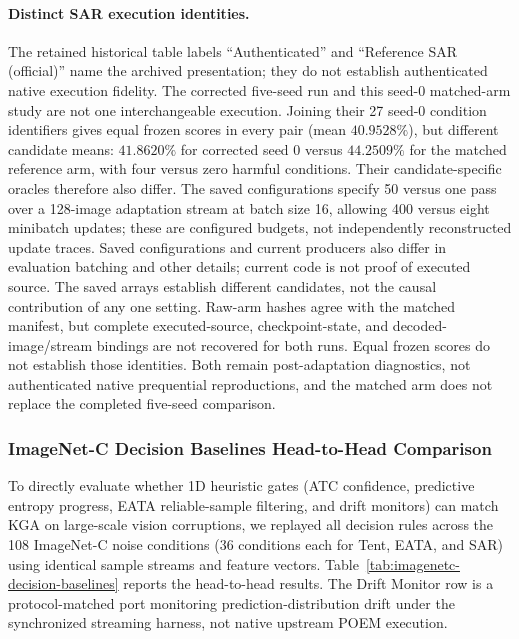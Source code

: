 

\paragraph{Distinct SAR execution identities.}
The retained historical table labels ``Authenticated'' and ``Reference SAR
(official)'' name the archived presentation; they do not establish authenticated
native execution fidelity.
The corrected five-seed run and this seed-0 matched-arm study are not one
interchangeable execution. Joining their 27 seed-0 condition identifiers gives
equal frozen scores in every pair (mean $40.9528\%$), but different candidate
means: $41.8620\%$ for corrected seed 0 versus $44.2509\%$ for the matched
reference arm, with four versus zero harmful conditions. Their candidate-specific
oracles therefore also differ. The saved configurations specify 50 versus one
pass over a 128-image adaptation stream at batch size 16, allowing 400 versus
eight minibatch updates; these are configured budgets, not independently
reconstructed update traces. Saved configurations and current producers also
differ in evaluation batching and other details; current code is not proof of
executed source. The saved arrays establish different candidates, not the causal
contribution of any one setting. Raw-arm hashes agree with the matched manifest,
but complete executed-source, checkpoint-state, and decoded-image/stream bindings
are not recovered for both runs. Equal frozen scores do not establish those
identities. Both remain post-adaptation diagnostics, not authenticated native
prequential reproductions, and the matched arm does not replace the completed
five-seed comparison.

\subsubsection{ImageNet-C Decision Baselines Head-to-Head Comparison}
\label{app:imagenetc-decision-baselines}

To directly evaluate whether 1D heuristic gates (ATC confidence, predictive entropy progress, EATA reliable-sample filtering,
and drift monitors) can match KGA on large-scale vision corruptions, we replayed all decision rules across the 108
ImageNet-C noise conditions (36 conditions each for Tent, EATA, and SAR) using identical sample streams and feature vectors.
Table~\ref{tab:imagenetc-decision-baselines} reports the head-to-head results. The Drift Monitor row is a protocol-matched
port monitoring prediction-distribution drift under the synchronized streaming harness, not native upstream POEM execution.

